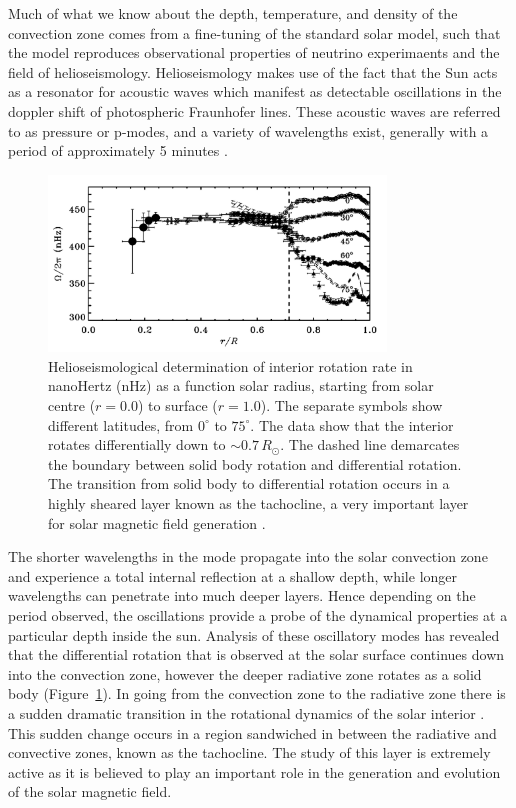 Much of what we know about the depth, temperature, and density of the convection zone comes from a fine-tuning of the standard solar model, such that the model reproduces observational properties of neutrino experimaents and the field of helioseismology. Helioseismology makes use of the fact that the Sun acts as a resonator for acoustic waves which manifest as detectable oscillations in the doppler shift of photospheric Fraunhofer lines. These acoustic waves are referred to as pressure or p-modes, and a variety of wavelengths exist, generally with a period of approximately 5 minutes \citep{turk2011}. 

\begin{figure}[!t]
\begin{center}
\includegraphics[trim = 0cm 0.5cm 0cm 0cm, width=0.8\textwidth]{images/differential_rot.png}
\caption[Differential rotation rate as a function of latitude and depth]{Helioseismological determination of interior rotation rate in nanoHertz (nHz) as a function solar radius, starting from solar centre ($r=0.0$) to surface ($r=1.0$). The separate symbols show different latitudes, from $0^{\circ}$ to $75^{\circ}$. The data show that the interior rotates differentially down to $\sim$$0.7\,R_{\odot}$. The dashed line demarcates the boundary between solid body rotation and differential rotation. The transition from solid body to differential rotation occurs in a highly sheared layer known as the tachocline, a very important layer for solar magnetic field generation \citep{thompson2003}.}
\label{fig:diff_rot} 
\end{center}
\end{figure}

The shorter wavelengths in the mode propagate into the solar convection zone and experience a total internal reflection at a shallow depth, while longer wavelengths can penetrate into much deeper layers. Hence depending on the period observed, the oscillations provide a probe of the dynamical properties at a particular depth inside the sun. Analysis of these oscillatory modes has revealed that the differential rotation that is observed at the solar surface continues down into the convection zone, however the deeper radiative zone rotates as a solid body (Figure~\ref{fig:diff_rot}). In going from the convection zone to the radiative zone there is a sudden dramatic transition in the rotational dynamics of the solar interior \citep{thompson2003}. This sudden change occurs in a region sandwiched in between the radiative and convective zones, known as the tachocline. The study of this layer is extremely active as it is believed to play an important role in the generation and evolution of the solar magnetic field.


